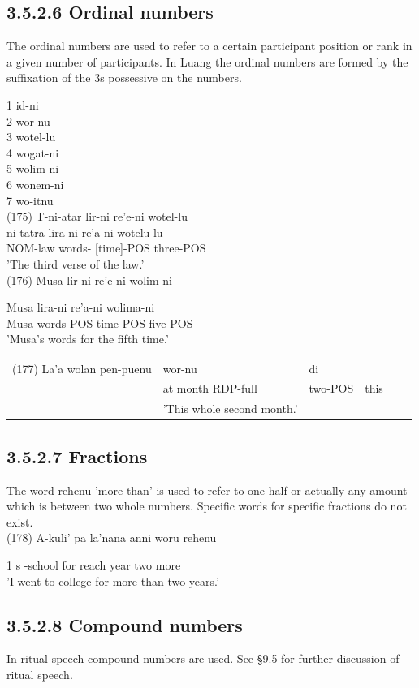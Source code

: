 \documentclass[10pt]{article}
\begin{document}
\subsection*{3.5.2.6 Ordinal numbers}
The ordinal numbers are used to refer to a certain participant position or rank in a given number of participants. In Luang the ordinal numbers are formed by the suffixation of the 3s possessive on the numbers.

1 id-ni\\
2 wor-nu\\
3 wotel-lu\\
4 wogat-ni\\
5 wolim-ni\\
6 wonem-ni\\
7 wo-itnu\\
(175) T-ni-atar lir-ni re'e-ni wotel-lu\\
ni-tatra lira-ni re'a-ni wotelu-lu\\[0pt]
NOM-law words- [time]-POS three-POS\\
'The third verse of the law.'\\
(176) Musa lir-ni re'e-ni wolim-ni

Musa lira-ni re'a-ni wolima-ni\\
Musa words-POS time-POS five-POS\\
'Musa's words for the fifth time.'

\begin{center}
\begin{tabular}{llllll}
(177) La'a wolan pen-puenu & wor-nu & di &  \\
 & at month RDP-full & two-POS & this \\
 & 'This whole second month.' &  &  \\
\end{tabular}
\end{center}

\subsection*{3.5.2.7 Fractions}
The word rehenu 'more than' is used to refer to one half or actually any amount which is between two whole numbers. Specific words for specific fractions do not exist.\\
(178) A-kuli' pa la'nana anni woru rehenu

1 s -school for reach year two more\\
'I went to college for more than two years.'

\subsection*{3.5.2.8 Compound numbers}
In ritual speech compound numbers are used. See §9.5 for further discussion of ritual speech.
\end{document}
